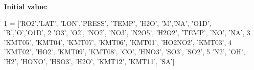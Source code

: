 {\bfseries Initial value\+:}
\begin{DoxyCode}
1 =  [\textcolor{stringliteral}{'RO2'},\textcolor{stringliteral}{'LAT'}, \textcolor{stringliteral}{'LON'},\textcolor{stringliteral}{'PRESS'}, \textcolor{stringliteral}{'TEMP'}, \textcolor{stringliteral}{'H2O'}, \textcolor{stringliteral}{'M'},\textcolor{stringliteral}{'NA'}, \textcolor{stringliteral}{'O1D'}, \textcolor{stringliteral}{'R','}O','O1D',
2  \textcolor{stringliteral}{'O3'}, \textcolor{stringliteral}{'O2'}, \textcolor{stringliteral}{'NO2'}, \textcolor{stringliteral}{'NO3'}, \textcolor{stringliteral}{'N2O5'}, \textcolor{stringliteral}{'H2O2'}, \textcolor{stringliteral}{'TEMP'}, \textcolor{stringliteral}{'NO'}, \textcolor{stringliteral}{'NA'},
3  \textcolor{stringliteral}{'KMT05'}, \textcolor{stringliteral}{'KMT04'}, \textcolor{stringliteral}{'KMT07'}, \textcolor{stringliteral}{'KMT06'}, \textcolor{stringliteral}{'KMT01'}, \textcolor{stringliteral}{'HO2NO2'}, \textcolor{stringliteral}{'KMT03'},
4   \textcolor{stringliteral}{'KMT02'}, \textcolor{stringliteral}{'HO2'}, \textcolor{stringliteral}{'KMT09'}, \textcolor{stringliteral}{'KMT08'}, \textcolor{stringliteral}{'CO'}, \textcolor{stringliteral}{'HNO3'}, \textcolor{stringliteral}{'SO3'}, \textcolor{stringliteral}{'SO2'},
5   \textcolor{stringliteral}{'N2'}, \textcolor{stringliteral}{'OH'}, \textcolor{stringliteral}{'H2'}, \textcolor{stringliteral}{'HONO'}, \textcolor{stringliteral}{'HSO3'}, \textcolor{stringliteral}{'H2O'}, \textcolor{stringliteral}{'KMT12'}, \textcolor{stringliteral}{'KMT11'}, \textcolor{stringliteral}{'SA'}]
\end{DoxyCode}
